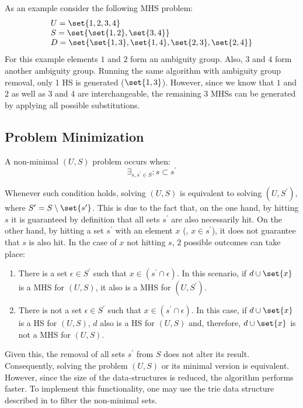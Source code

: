 As an example consider the following \ac{MHS} problem:
\begin{equation}
  \begin{array}{l}
    U = \set{1,2,3,4}\\
    S = \set{\set{1,2}, \set{3,4}}\\
    D = \set{\set{1,3}, \set{1,4}, \set{2,3},\set{2,4}}
  \end{array}
\end{equation}
%
For this example elements $1$ and $2$ form an ambiguity group.
%
Also, $3$ and $4$ form another ambiguity group.
%
Running the same algorithm with ambiguity group removal, only 1
\ac{HS} is generated ($\set{1,3}$).
%
However, since we know that $1$ and $2$ as well as $3$ and $4$ are
interchangeable, the remaining $3$ \acp{MHS} can be generated by
applying all possible substitutions.

\subsection{Problem Minimization}
\label{sec:mhs2o:problem-minimization}
A non-minimal $(U,S)$ problem occurs when:
\begin{equation}
  \exists_{s, s^\prime \in S} : s \subset s^\prime
\end{equation}

Whenever such condition holds, solving $(U,S)$ is equivalent to
solving $(U,S^\prime)$, where $S^\prime = S\setminus \set{s^\prime}$.
%
This is due to the fact that, on the one hand, by hitting $s$ it is
guaranteed by definition that all sets $s^\prime$ are also necessarily
hit.
%
On the other hand, by hitting a set $s^\prime$ with an element $x$
(\ie, $x\in s^\prime$), it does not guarantee that $s$ is also hit.
%
In the case of $x$ not hitting $s$, $2$ possible outcomes can take
place:
%
\begin{enumerate}
\item There is a set $\epsilon \in S^\prime$ such that $x \in
  (s^\prime \cap \epsilon)$.
  In this scenario, if $d \cup \set{x}$ is a \ac{MHS} for $(U,S)$, it
  also is a \ac{MHS} for $(U, S^\prime)$.
\item There is not a set $\epsilon \in S^\prime$ such that $x \in
  (s^\prime \cap \epsilon)$.
  In this case, if $d \cup \set{x}$ is a \ac{HS} for $(U,S)$, $d$ also
  is a \ac{HS} for $(U,S)$ and, therefore, $d \cup \set{x}$ is not a
  \ac{MHS} for $(U,S)$.
\end{enumerate}
%

%
Given this, the removal of all sets $s^\prime$ from $S$ does not alter
its result.
%
Consequently, solving the problem $(U,S)$ or its minimal version is
equivalent.
%
However, since the size of the data-structures is reduced, the
algorithm performs faster.
%
To implement this functionality, one may use the trie data structure
described in  to filter the non-minimal sets.


